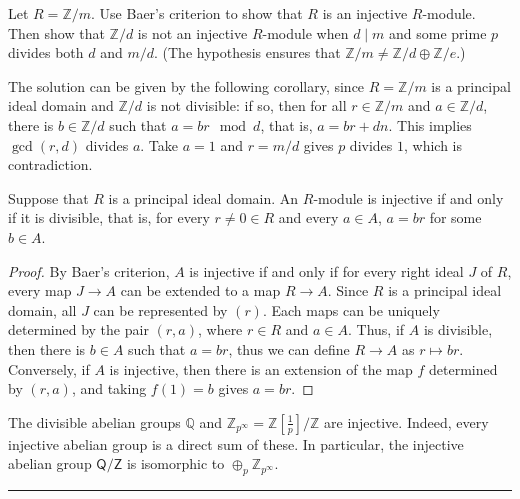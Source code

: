 \begin{exer} Let $R=\mathbb{Z}/m$. Use Baer's criterion to show that $R$ is an injective $R$-module. Then show that $\mathbb{Z}/d$ is not an injective $R$-module when $d\mid m$ and some prime $p$ divides both $d$ and $m/d$. (The hypothesis ensures that $\mathbb{Z}/m\neq \mathbb{Z}/d\oplus \mathbb{Z}/e$.)
\end{exer}
\begin{solution}
The solution can be given by the following corollary, since $R=\mathbb{Z}/m$ is a principal ideal domain and $\mathbb{Z}/d$ is not divisible: if so, then for all $r\in \mathbb{Z}/m$ and $a\in \mathbb{Z}/d$, there is $b\in \mathbb{Z}/d$ such that $a=br \mod d$, that is, $a=br+dn$. This implies $\gcd(r,d)$ divides $a$. Take $a=1$ and $r=m/d$ gives $p$ divides $1$, which is contradiction.
\end{solution}

\begin{cor} Suppose that $R$ is a principal ideal domain. An $R$-module is injective if and only if it is divisible, that is, for every $r\neq 0\in R$ and every $a\in A$, $a=br$ for some $b\in A$.
\end{cor}
\begin{proof}
By Baer's criterion, $A$ is injective if and only if for every right ideal $J$ of $R$, every map $J\rightarrow A$ can be extended to a map $R\rightarrow A$. Since $R$ is a principal ideal domain, all $J$ can be represented by $(r)$. Each maps can be uniquely determined by the pair $(r,a)$, where $r\in R$ and $a\in A$. Thus, if $A$ is divisible, then there is $b\in A$ such that $a=br$, thus we can define $R\rightarrow A$ as $r\mapsto br$. Conversely, if $A$ is injective, then there is an extension of the map $f$ determined by $(r,a)$, and taking $f(1)=b$ gives $a=br$.
\end{proof}

\begin{exmp} The divisible abelian groups $\mathbb{Q}$ and $\mathbb{Z}_{p^\infty}=\mathbb{Z}\left[\frac{1}{p}\right]/\mathbb{Z}$ are injective. Indeed, every injective abelian group is a direct sum of these. In particular, the injective abelian group $\mathsf{Q}/\mathsf{Z}$ is isomorphic to $\oplus_p \mathbb{Z}_{p^\infty}$.
\end{exmp}
\noindent\rule{\textwidth}{1pt}
\newline